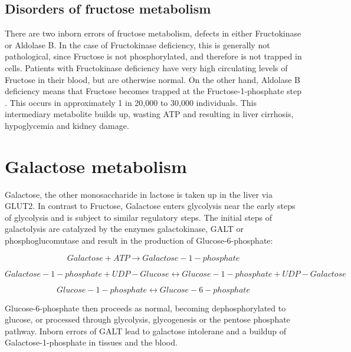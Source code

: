 \documentclass{tufte-handout}
\begin{document}
\subsection{Disorders of fructose metabolism}

There are two inborn errors of fructose metabolism, defects in either Fructokinase or Aldolase B.  In the case of Fructokinase deficiency, this is generally not pathological, since Fructose is not phosphorylated, and therefore is not trapped in cells.  Patients with Fructokinase deficiency have very high circulating levels of Fructose in their blood, but are otherwise normal.  On the other hand, Aldolase B deficiency means that Fructose becomes trapped at the Fructose-1-phosphate step \citep{Cross1988}.  This occurs in approximately 1 in 20,000 to 30,000 individuals.  This intermediary metabolite builds up, wasting ATP and resulting in liver cirrhosis, hypoglycemia and kidney damage.

\section{Galactose metabolism}

Galactose, the other monosaccharide in lactose is taken up in the liver via GLUT2.  In contrast to Fructose, Galactose enters glycolysis near the early steps of glycolysis and is subject to similar regulatory steps.  The initial steps of galactolysis are catalyzed by the enzymes galactokinase, GALT or phosphoglucomutase and result in the production of Glucose-6-phosphate:

\begin{equation}
Galactose + ATP \rightarrow Galactose-1-phosphate
\end{equation}

\begin{equation}
Galactose-1-phosphate + UDP-Glucose \leftrightarrow Glucose-1-phosphate + UDP-Galactose
\end{equation}

\begin{equation}
Glucose-1-phosphate \leftrightarrow Glucose-6-phosphate
\end{equation}

Glucose-6-phosphate then proceeds as normal, becoming dephosphorylated to glucose, or processed through glycolysis, glycogenesis or the pentose phosphate pathway.  Inborn errors of GALT lead to galactose intolerane and a buildup of Galactose-1-phosphate in tissues and the blood.



\end{document}
